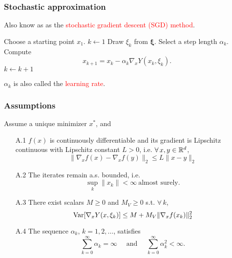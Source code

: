 \documentclass{beamer}
\def\bxi{\boldsymbol\xi}
\begin{document}
\begin{frame}
\frametitle{Stochastic approximation}

Also know as as the \textcolor{red}{stochastic gradient descent (SGD) method}.

\mbox{}

\begin{algorithmic}
\State Choose a starting point $x_1$.
\State $k \leftarrow 1$
\State Draw $\xi_k$ from $\bxi$.
\State Select a step length $\alpha_k$.
\State Compute
$$
x_{k+1} = x_k - \alpha_k \nabla_x Y(x_k, \xi_k).
$$
\State $k \leftarrow k+1$
\EndWhile
\end{algorithmic}

\mbox{}

$\alpha_k$ is also called the \textcolor{red}{learning rate}.

\end{frame}

\begin{frame}
\frametitle{Assumptions}


Assume a unique minimizer $x^*$, and
\begin{enumerate}
\item[A.1]
$f(x)$ is continuously differentiable and its gradient is Lipschitz continuous with Lipschitz constant $L > 0$, i.e. $\forall\, x, y \in {\mathbb{R}}^d$,
$$
\| \nabla_x f(x) - \nabla_x f(y) \|_2 \leq L \| x - y \|_2
$$
\item[A.2]
The iterates remain a.s. bounded, i.e.
$$
\sup_k \| x_k \| < \infty\ \text{almost surely}.
$$
\item[A.3]
There exist scalars $M \geq 0$ and $M_V \geq 0$ s.t. $\forall\, k$,
$$
\operatorname{Var}[\nabla_x Y(x, \xi_k)] \leq M + M_V\| \nabla_x f(x_k)\|_2^2
$$
\item[A.4]
The sequence $\alpha_k$, $k=1,2,\ldots$, satisfies
$$
\sum_{k=0}^{\infty}\alpha_k=\infty \quad \mbox{ and } \quad \sum_{k=0}^{\infty}\alpha_k^{2} < \infty.
$$
\end{enumerate}

\end{frame}
\end{document}
